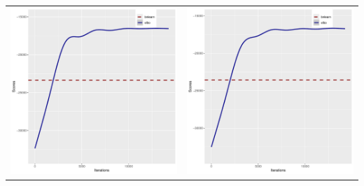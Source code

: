 \documentclass[]{scrartcl}
\begin{document}
\begin{tabular}{cc}
\includegraphics[scale = 0.4]{./figs/win95pts/mapEvolution-3-14252.pdf} &
\includegraphics[scale = 0.4]{./figs/win95pts/mapEvolution-4-14252.pdf} \\
\end{tabular}
\end{document}
